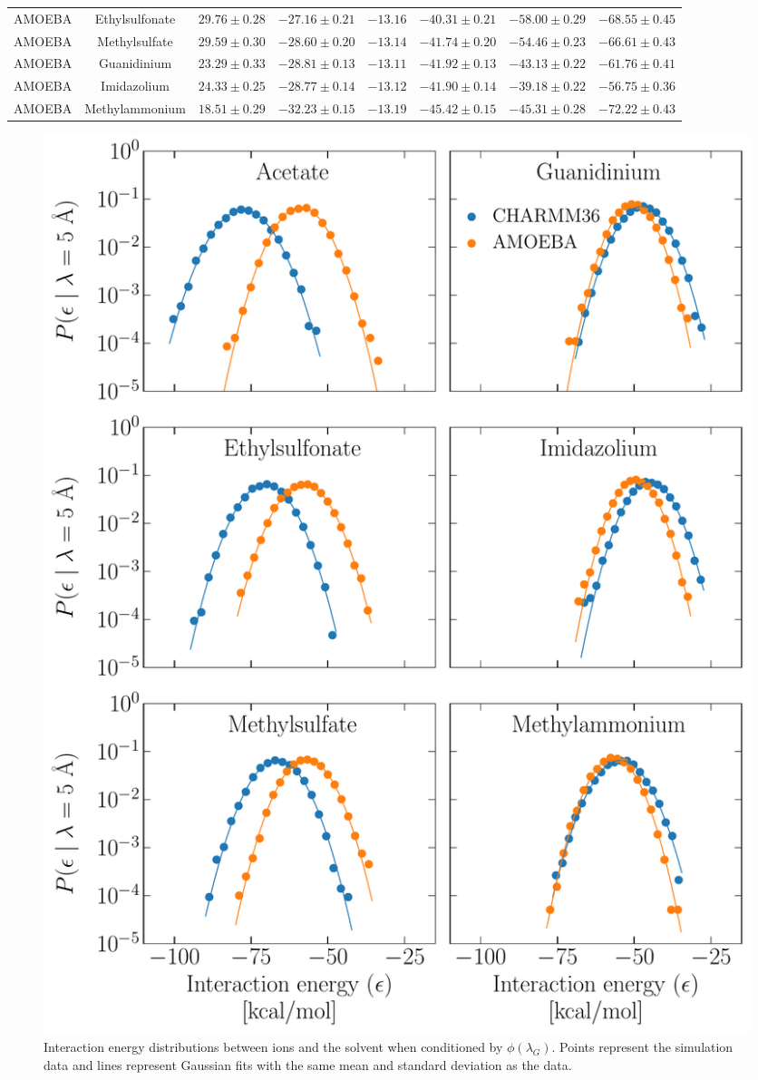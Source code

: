 \documentclass[journal=jacsat,articletitle=true,manuscript=suppinfo,layout=onecolumn]{achemso}
\begin{document}
\begin{landscape}
\begin{adjustbox}
\begin{tabular}{c | c | c | c | c | c | c | c }
    AMOEBA      & Ethylsulfonate & $29.76 \pm 0.28$ & $-27.16 \pm 0.21$ & $-13.16$ & $-40.31 \pm 0.21$ & $-58.00 \pm 0.29$ & $-68.55 \pm 0.45$ \\
    AMOEBA      & Methylsulfate  & $29.59 \pm 0.30$ & $-28.60 \pm 0.20$ & $-13.14$ & $-41.74 \pm 0.20$ & $-54.46 \pm 0.23$ & $-66.61 \pm 0.43$ \\
    AMOEBA      & Guanidinium    & $23.29 \pm 0.33$ & $-28.81 \pm 0.13$ & $-13.11$ & $-41.92 \pm 0.13$ & $-43.13 \pm 0.22$ & $-61.76 \pm 0.41$ \\
    AMOEBA      & Imidazolium    & $24.33 \pm 0.25$ & $-28.77 \pm 0.14$ & $-13.12$ & $-41.90 \pm 0.14$ & $-39.18 \pm 0.22$ & $-56.75 \pm 0.36$ \\
    AMOEBA      & Methylammonium & $18.51 \pm 0.29$ & $-32.23 \pm 0.15$ & $-13.19$ & $-45.42 \pm 0.15$ & $-45.31 \pm 0.28$ & $-72.22 \pm 0.43$
    \end{tabular}
    \end{adjustbox}
    \end{landscape}

    \begin{figure}[H]
    \begin{center}
        \includegraphics[width=0.95\columnwidth]{images/gaussian_check.pdf}
        \caption{Interaction energy distributions between ions and the solvent when conditioned by $\phi(\lambda_G)$. Points represent the simulation data and lines represent Gaussian fits with the same mean and standard deviation as the data.}
        \label{fig:gaussian_check}
    \end{center}
    \end{figure}
    
\end{document}
